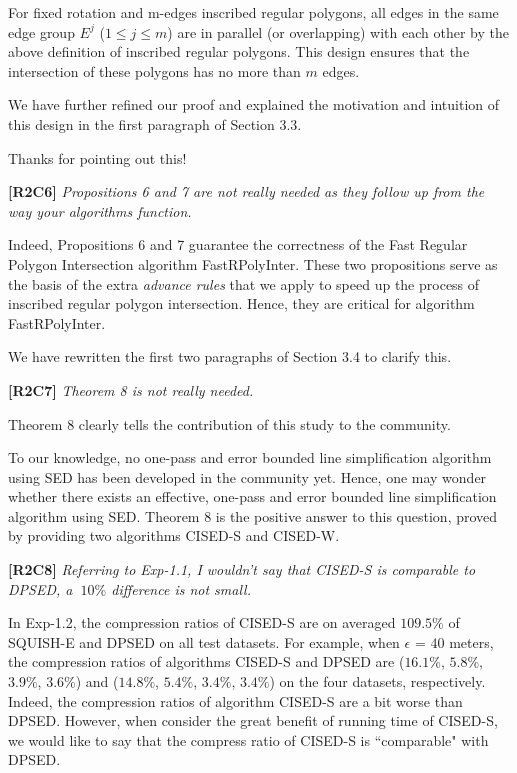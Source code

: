 \documentclass{letter}
\begin{document}
For fixed rotation and m-edges inscribed regular polygons,  all edges in the same edge group $E^j$ ($1\le j\le m$) are in parallel (or overlapping) with each other by the above definition of inscribed regular polygons. This design ensures that the intersection of these polygons has no more than $m$ edges.

We have further refined our proof and explained the motivation and intuition of this design in the first paragraph of Section 3.3.

Thanks for pointing out this!

\textbf{[R2C6]} \emph{Propositions 6 and 7 are not really needed as they follow up from the way your algorithms function.}

Indeed, Propositions 6 and 7 guarantee the correctness of the Fast Regular Polygon Intersection algorithm FastRPolyInter.
These two propositions serve as the basis of the extra \emph{advance rules} that we apply to speed up the process of inscribed regular polygon intersection. Hence, they are critical for algorithm FastRPolyInter.



We have rewritten the first two paragraphs of Section 3.4 to clarify this.

\textbf{[R2C7]} \emph{Theorem 8 is not really needed.}

Theorem 8 clearly tells the contribution of this study to the community.

To our knowledge, no one-pass and error bounded line simplification algorithm using SED has been developed in the community yet. Hence, one may wonder whether there exists an effective, one-pass and error bounded line simplification algorithm using SED. Theorem 8 is the positive answer to this question, proved by providing two algorithms CISED-S and CISED-W.


\textbf{[R2C8]} \emph{Referring to Exp-1.1, I wouldn't say that CISED-S is comparable to DPSED, a $~10\%$ difference is not small.}

In Exp-1.2, the compression ratios of CISED-S are on averaged $109.5\%$ of SQUISH-E and DPSED on all test datasets. For example, when $\epsilon$ = $40$ meters, the compression ratios of algorithms CISED-S and DPSED are ($16.1\%$, $5.8\%$, $3.9\%$, $3.6\%$) and ($14.8\%$, $5.4\%$, $3.4\%$, $3.4\%$) on the four datasets, respectively. Indeed, the compression ratios of algorithm CISED-S are a bit worse than DPSED. However, when consider the great benefit of running time of CISED-S, we would like to say that the compress ratio of CISED-S is ``comparable" with DPSED.
\end{document}
